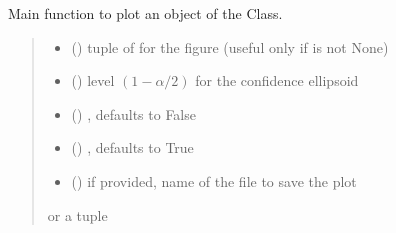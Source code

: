 \documentclass[letterpaper,10pt,english]{sphinxmanual}
\begin{document}
\begin{fulllineitems}
\begin{fulllineitems}
\label{\detokenize{cubmods:cubmods.cube.CUBresCUBE.plot}}
\pysigstartsignatures
{}
\pysigstopsignatures
\sphinxAtStartPar
Main function to plot an object of the Class.
\begin{quote}\begin{description}
\begin{itemize}
\item {} 
\sphinxAtStartPar
{} () \textendash{} tuple of  for the figure (useful only if  is not None)

\item {} 
\sphinxAtStartPar
{} () \textendash{} level \((1-\alpha/2)\) for the confidence ellipsoid

\item {} 
\sphinxAtStartPar
{} () \textendash{} , defaults to False

\item {} 
\sphinxAtStartPar
{} () \textendash{} , defaults to True

\item {} 
\sphinxAtStartPar
{} () \textendash{} if provided, name of the file to save the plot

\end{itemize}

\sphinxAtStartPar
{} or a tuple 

\end{description}\end{quote}


\end{fulllineitems}
\end{fulllineitems}
\end{document}
